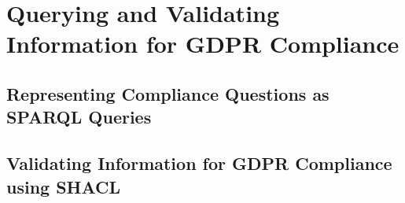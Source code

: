 \chapter{Querying and Validating Information for GDPR Compliance}
\label{chapter:testing}

\section{Representing Compliance Questions as SPARQL Queries}\label{sec:testing:sparql}

\section{Validating Information for GDPR Compliance using SHACL}\label{sec:testing:shacl}